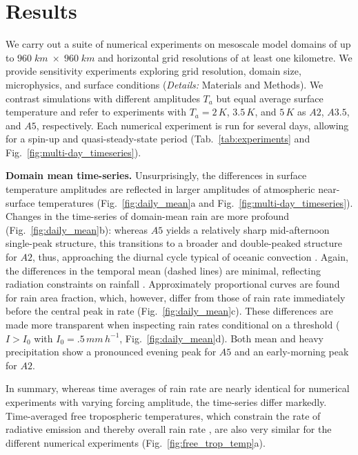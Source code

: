 \documentclass{article}
\begin{document}
\section*{Results}\label{sec:results}
\noindent
We carry out a suite of numerical experiments on mesoscale model domains of up to $960\;km\;\times\;960\;km$ and horizontal grid resolutions of at least one kilometre. We provide sensitivity experiments exploring grid resolution, domain size, microphysics, and surface conditions ({\it Details:} Materials and Methods).
We contrast simulations with different amplitudes $T_a$ but equal average surface temperature and refer to experiments with $T_a=2\,K$, $3.5\,K$, and $5\,K$ as $A2$, $A3.5$, and $A5$, respectively.
Each numerical experiment is run for several days, allowing for a spin-up and quasi-steady-state period (Tab.~\ref{tab:experiments} and Fig.~\ref{fig:multi-day_timeseries}). 

\noindent
{\bf Domain mean time-series.}
Unsurprisingly, the differences in surface temperature amplitudes are reflected in larger amplitudes of atmospheric near-surface temperatures (Fig.~\ref{fig:daily_mean}a and Fig.~\ref{fig:multi-day_timeseries}).
Changes in the time-series of domain-mean rain are more profound (Fig.~\ref{fig:daily_mean}b): whereas $A5$ yields a relatively sharp mid-afternoon single-peak structure, this transitions to a broader and double-peaked structure for $A2$, %
thus, approaching the diurnal cycle typical of oceanic convection \cite{yang2001diurnal}.
Again, the differences in the temporal mean (dashed lines) are minimal, reflecting radiation constraints on rainfall \cite{held2006robust}.
Approximately proportional curves are found for rain area fraction, which, however, differ from those of rain rate immediately before the central peak in rate (Fig.~\ref{fig:daily_mean}c).
These differences are made more transparent when inspecting rain rates conditional on a threshold ($I>I_0$ with $I_0=.5\,mm\,h^{-1}$, Fig.~\ref{fig:daily_mean}d). 
Both mean and heavy precipitation show a pronounced evening peak for $A5$ and an early-morning peak for $A2$.

In summary, whereas time averages of rain rate are nearly identical for numerical experiments with varying forcing amplitude, the time-series %
differ markedly.
Time-averaged free tropospheric temperatures, which constrain the rate of radiative emission and thereby overall rain rate \cite{held2006robust}, are also very similar for the different numerical experiments (Fig.~\ref{fig:free_trop_temp}a).
\end{document}

